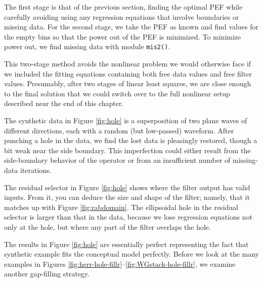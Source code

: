 \par
The first stage is that of the previous section,
finding the optimal PEF while
carefully avoiding using any regression equations
that involve boundaries or missing data.
For the second stage,
we take the PEF as known and
find values for the empty bins so that the power out of the PEF is minimized.
To minimize power out,
we find missing data with module \texttt{mis2()}.

\par
This two-stage method avoids the nonlinear problem
we would otherwise face if we included the fitting
equations containing both free data values and free filter values.
Presumably, after
two stages of linear least squares,
we are close enough to the final solution
that we could switch over to the full nonlinear setup
described near the end of this chapter.

\par
The synthetic data in Figure \ref{fig:hole}
is a superposition of two plane waves of different directions,
each with a random (but low-passed) waveform.
After punching a hole in the data,
we find the lost data is pleasingly restored,
though a bit weak near the side boundary.
This imperfection could either result
from the side-boundary behavior of the operator
or from an insufficient number of missing-data iterations.
\par
The residual selector in Figure \ref{fig:hole}
shows where the filter output has valid inputs.
From it, you can deduce the size and shape of the filter;
namely, that it matches up with Figure \ref{fig:rabdomain}.
The ellipsoidal hole in the residual selector is larger
than that in the data, because we lose regression equations
not only at the hole,
but where any part of the filter overlaps the hole.

\par
The results in Figure \ref{fig:hole} are essentially perfect
representing the fact that synthetic example
fits the conceptual model perfectly.
Before we look at the many examples
in Figures
\ref{fig:herr-hole-fillr}--\ref{fig:WGstack-hole-fillr},
we  examine another gap-filling strategy.




